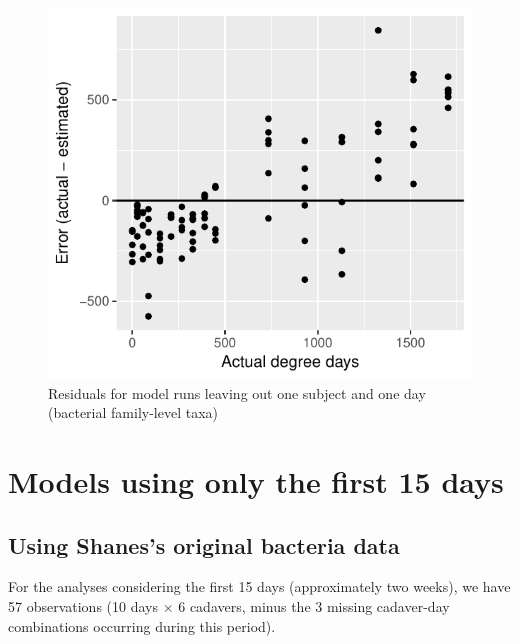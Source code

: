 \documentclass{article}
\begin{document}
\begin{figure}
  \centering
  \includegraphics{../revise_algorithm/only_families/all_time_steps/hit_1perc_twice/leave_out_one_subj_and_one_day_residuals}
  \caption{Residuals for model runs leaving out one subject and one day (bacterial family-level taxa)}
  \label{fig:leave_one_out_resids_bac_family_taxa}
\end{figure}






\section{Models using only the first 15 days}

\subsection{Using Shanes's original bacteria data}

For the analyses considering the first 15 days (approximately two
weeks), we have 57 observations (10 days $\times$ 6 cadavers, minus
the 3 missing cadaver-day combinations occurring during this period).
\end{document}

